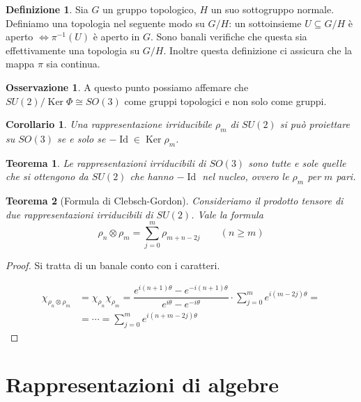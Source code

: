 \documentclass[11pt]{article}
\theoremstyle{plain}
\newtheorem{thm}{Teorema}[section]
\newtheorem*{cor}{Corollario}
\theoremstyle{definition}
\newtheorem{defn}{Definizione}[section]
\newtheorem*{rem}{Osservazione}
\theoremstyle{remark}
\newcommand{\dsum}{\displaystyle\sum}
\DeclareMathOperator{\Ker}{Ker}
\DeclareMathOperator{\Id}{Id}
\begin{document}
   \begin{defn}
     Sia $G$ un gruppo topologico, $H$ un suo sottogruppo normale. Definiamo una topologia nel seguente modo su $G/H$: un sottoinsieme $U \subseteq G/H$ è aperto $\Leftrightarrow \pi^{-1}(U)$ è aperto in $G$. Sono banali verifiche che questa sia effettivamente una topologia su $G/H$. Inoltre questa definizione ci assicura che la mappa $\pi$ sia continua.
   \end{defn}

   \begin{rem}
     A questo punto possiamo affemare che $SU(2) / \Ker\Phi \cong SO(3)$ come gruppi topologici e non solo come gruppi.
   \end{rem}



   \begin{cor}
     Una rappresentazione irriducibile $\rho_m$ di $SU(2)$ si può proiettare su $SO(3)$ se e solo se $- \Id \in \Ker \rho_m$.
   \end{cor}


   \begin{thm}
     Le rappresentazioni irriducibili di $SO(3)$ sono tutte e sole quelle che si ottengono da $SU(2)$ che hanno $-\Id$ nel nucleo, ovvero le $\rho_m$ per $m$ pari.
   \end{thm}


   \begin{thm}[Formula di Clebsch-Gordon]
     Consideriamo il prodotto tensore di due rappresentazioni irriducibili di $SU(2)$. Vale la formula
     \[ \rho_n\otimes \rho_m = \dsum_{j=0}^m \rho_{m+n-2j} \qquad (n \geq m)\]
   \end{thm}

   \begin{proof}
     Si tratta di un banale conto con i caratteri.

     \begin{align*}
       \chi_{\rho_n\otimes\rho_m} &= \chi_{\rho_n} \chi_{\rho_m} = \dfrac{e^{i(n+1)\theta} - e^{-i(n+1)\theta}}{e^{i\theta} - e^{-i\theta}} \cdot \dsum_{j=0}^m e^{i(m-2j)\theta} =\\ 
                                  &= \cdots = \dsum_{j = 0}^m e^{i(n+m-2j)\theta}
     \end{align*}
   \end{proof}


   
   
\newpage
\section{Rappresentazioni di algebre}
\end{document}
